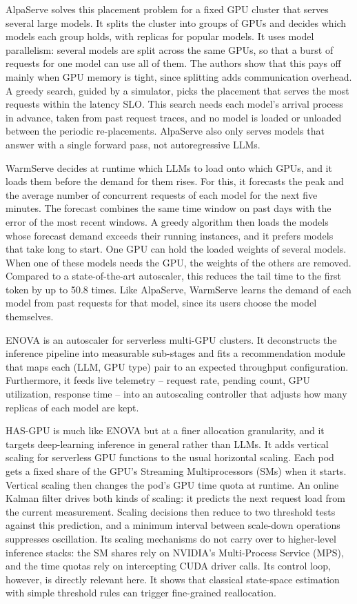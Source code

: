 AlpaServe \cite{alpaserve} solves this placement problem for a fixed GPU cluster that serves several large models.
It splits the cluster into groups of GPUs and decides which models each group holds, with replicas for popular models.
It uses model parallelism: several models are split across the same GPUs, so that a burst of requests for one model can use all of them.
The authors show that this pays off mainly when GPU memory is tight, since splitting adds communication overhead.
A greedy search, guided by a simulator, picks the placement that serves the most requests within the latency SLO.
This search needs each model's arrival process in advance, taken from past request traces, and no model is loaded or unloaded between the periodic re-placements.
AlpaServe also only serves models that answer with a single forward pass, not autoregressive LLMs.

WarmServe \cite{warmserve} decides at runtime which LLMs to load onto which GPUs, and it loads them before the demand for them rises.
For this, it forecasts the peak and the average number of concurrent requests of each model for the next five minutes.
The forecast combines the same time window on past days with the error of the most recent windows.
A greedy algorithm then loads the models whose forecast demand exceeds their running instances, and it prefers models that take long to start.
One GPU can hold the loaded weights of several models.
When one of these models needs the GPU, the weights of the others are removed.
Compared to a state-of-the-art autoscaler, this reduces the tail time to the first token by up to 50.8 times.
Like AlpaServe, WarmServe learns the demand of each model from past requests for that model, since its users choose the model themselves.

ENOVA \cite{enova} is an autoscaler for serverless multi-GPU clusters.
It deconstructs the inference pipeline into measurable sub-stages and fits a recommendation module that maps each (LLM, GPU type) pair to an expected throughput configuration.
Furthermore, it feeds live telemetry -- request rate, pending count, GPU utilization, response time -- into an autoscaling controller that adjusts how many replicas of each model are kept.

HAS-GPU \cite{hasgpu} is much like ENOVA but at a finer allocation granularity, and it targets deep-learning inference in general rather than LLMs.
It adds vertical scaling for serverless GPU functions to the usual horizontal scaling.
Each pod gets a fixed share of the GPU's Streaming Multiprocessors (SMs) when it starts.
Vertical scaling then changes the pod's GPU time quota at runtime.
An online Kalman filter drives both kinds of scaling: it predicts the next request load from the current measurement.
Scaling decisions then reduce to two threshold tests against this prediction, and a minimum interval between scale-down operations suppresses oscillation.
Its scaling mechanisms do not carry over to higher-level inference stacks: the SM shares rely on NVIDIA's Multi-Process Service (MPS), and the time quotas rely on intercepting CUDA driver calls.
Its control loop, however, is directly relevant here.
It shows that classical state-space estimation with simple threshold rules can trigger fine-grained reallocation.

